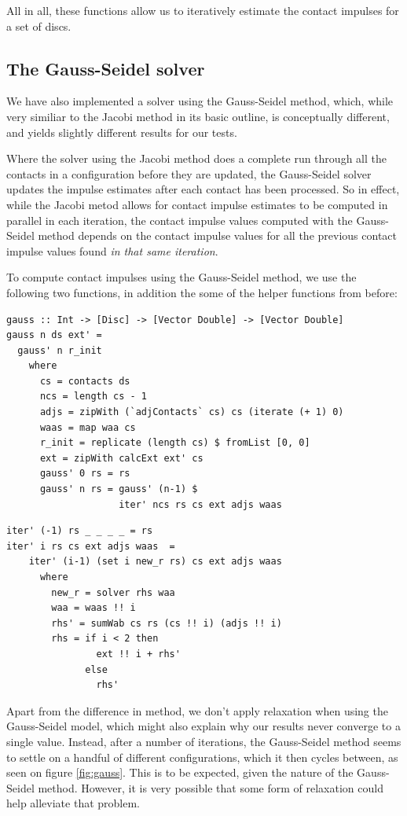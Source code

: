 \documentclass[runningheads,a4paper]{llncs}
\begin{document}
All in all, these functions allow us to iteratively estimate the contact
impulses for a set of discs.

\subsection{The Gauss-Seidel solver}

We have also implemented a solver using the Gauss-Seidel method, which, while
very similiar to the Jacobi method in its basic outline, is conceptually
different, and yields slightly different results for our tests.

Where the solver using the Jacobi method does a complete run through all the
contacts in a configuration before they are updated, the Gauss-Seidel solver
updates the impulse estimates after each contact has been processed. So in
effect, while the Jacobi metod allows for contact impulse estimates to be
computed in parallel in each iteration, the contact impulse values computed
with the Gauss-Seidel method depends on the contact impulse values for all the
previous contact impulse values found \emph{in that same iteration}.

To compute contact impulses using the Gauss-Seidel method, we use the following
two functions, in addition the some of the helper functions from before:
\begin{verbatim}
gauss :: Int -> [Disc] -> [Vector Double] -> [Vector Double]
gauss n ds ext' =
  gauss' n r_init
    where
      cs = contacts ds
      ncs = length cs - 1
      adjs = zipWith (`adjContacts` cs) cs (iterate (+ 1) 0)
      waas = map waa cs
      r_init = replicate (length cs) $ fromList [0, 0]
      ext = zipWith calcExt ext' cs
      gauss' 0 rs = rs
      gauss' n rs = gauss' (n-1) $
                    iter' ncs rs cs ext adjs waas
\end{verbatim}
\begin{verbatim}
iter' (-1) rs _ _ _ _ = rs
iter' i rs cs ext adjs waas  =
    iter' (i-1) (set i new_r rs) cs ext adjs waas
      where
        new_r = solver rhs waa
        waa = waas !! i
        rhs' = sumWab cs rs (cs !! i) (adjs !! i)
        rhs = if i < 2 then
                ext !! i + rhs'
              else
                rhs'
\end{verbatim}
Apart from the difference in method, we don't apply relaxation when using the
Gauss-Seidel model, which might also explain why our results never converge to
a single value. Instead, after a number of iterations, the Gauss-Seidel method
seems to settle on a handful of different configurations, which it then cycles
between, as seen on figure \ref{fig:gauss}. This is to be expected, given the nature of the Gauss-Seidel
method. However, it is very possible that some form of relaxation could help
alleviate that problem.
\end{document}
